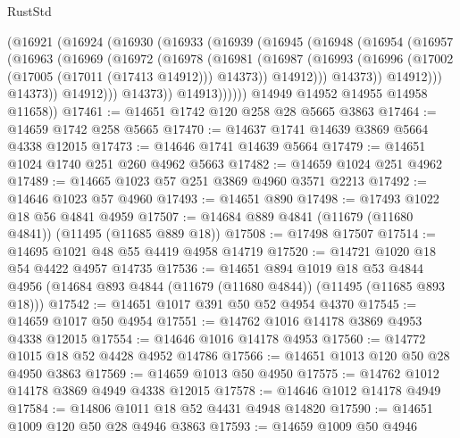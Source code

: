 \begin{lexlean}{RustStd}
\begin{coremodule}
                  (@16921
                    (@16924
                      (@16930
                        (@16933
                          (@16939
                            (@16945
                              (@16948
                                (@16954
                                  (@16957
                                    (@16963
                                      (@16969
                                        (@16972
                                          (@16978
                                            (@16981
                                              (@16987
                                                (@16993
                                                  (@16996
                                                    (@17002
                                                      (@17005 (@17011 (@17413 @14912)))
                                                      @14373))
                                                  @14912)))
                                            @14373))
                                        @14912)))
                                  @14373))
                              @14912)))
                        @14373))
                    @14913))))))
        @14949
        @14952
        @14955
        @14958
        @11658))
@17461 := @14651 @1742 @120 @258 @28 @5665 @3863
@17464 := @14659 @1742 @258 @5665
@17470 := @14637 @1741 @14639 @3869 @5664 @4338 @12015
@17473 := @14646 @1741 @14639 @5664
@17479 := @14651 @1024 @1740 @251 @260 @4962 @5663
@17482 := @14659 @1024 @251 @4962
@17489 := @14665 @1023 @57 @251 @3869 @4960 @3571 @2213
@17492 := @14646 @1023 @57 @4960
@17493 := @14651 @890
@17498 := @17493 @1022 @18 @56 @4841 @4959
@17507 := @14684 @889 @4841 (@11679 (@11680 @4841)) (@11495 (@11685 @889 @18))
@17508 := @17498 @17507
@17514 := @14695 @1021 @48 @55 @4419 @4958 @14719
@17520 := @14721 @1020 @18 @54 @4422 @4957 @14735
@17536 := @14651
    @894
    @1019
    @18
    @53
    @4844
    @4956
    (@14684 @893 @4844 (@11679 (@11680 @4844)) (@11495 (@11685 @893 @18)))
@17542 := @14651 @1017 @391 @50 @52 @4954 @4370
@17545 := @14659 @1017 @50 @4954
@17551 := @14762 @1016 @14178 @3869 @4953 @4338 @12015
@17554 := @14646 @1016 @14178 @4953
@17560 := @14772 @1015 @18 @52 @4428 @4952 @14786
@17566 := @14651 @1013 @120 @50 @28 @4950 @3863
@17569 := @14659 @1013 @50 @4950
@17575 := @14762 @1012 @14178 @3869 @4949 @4338 @12015
@17578 := @14646 @1012 @14178 @4949
@17584 := @14806 @1011 @18 @52 @4431 @4948 @14820
@17590 := @14651 @1009 @120 @50 @28 @4946 @3863
@17593 := @14659 @1009 @50 @4946

\end{coremodule}
\end{lexlean}
